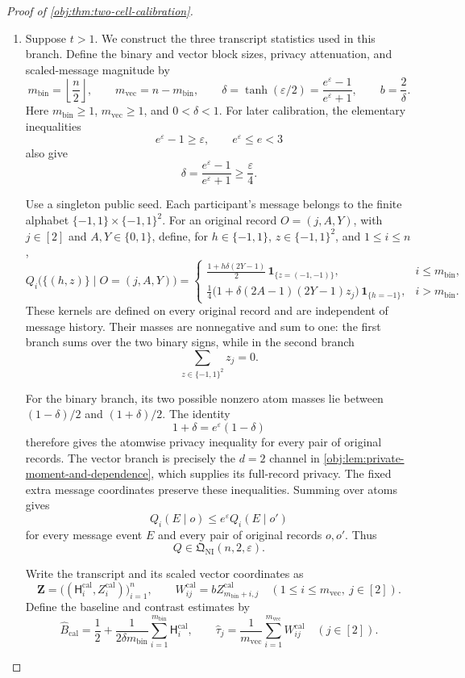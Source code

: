 \documentclass[11pt]{article}
\begin{document}
\begin{proof}[Proof of \cref{obj:thm:two-cell-calibration}]
\begin{enumerate}
\item
Suppose \(t>1\). We construct the three transcript statistics used in this branch. Define the binary and vector block sizes, privacy attenuation, and scaled-message magnitude by
\[
m_{\mathrm{bin}}=\left\lfloor\frac n2\right\rfloor,
\qquad
m_{\mathrm{vec}}=n-m_{\mathrm{bin}},
\qquad
\delta=\tanh(\varepsilon/2)
=\frac{e^\varepsilon-1}{e^\varepsilon+1},
\qquad
b=\frac2\delta.
\]
Here \(m_{\mathrm{bin}}\ge1\), \(m_{\mathrm{vec}}\ge1\), and \(0<\delta<1\).
For later calibration, the elementary inequalities
\[
e^\varepsilon-1\ge\varepsilon,
\qquad e^\varepsilon\le e<3
\]
also give
\[
\delta
=\frac{e^\varepsilon-1}{e^\varepsilon+1}
\ge\frac{\varepsilon}{4}.
\]

Use a singleton public seed. Each participant's message belongs to the finite alphabet
\(\{-1,1\}\times\{-1,1\}^{2}\). For an original record
\(O=(j,A,Y)\), with \(j\in[2]\) and \(A,Y\in\{0,1\}\), define, for
\(h\in\{-1,1\}\), \(z\in\{-1,1\}^{2}\), and \(1\le i\le n\),
\[
Q_i\bigl(\{(h,z)\}\mid O=(j,A,Y)\bigr)
=
\begin{cases}
\displaystyle
\frac{1+h\delta(2Y-1)}2\,
\mathbf1_{\{z=(-1,-1)\}},
& i\le m_{\mathrm{bin}},\\[6pt]
\displaystyle
\frac14\bigl(1+\delta(2A-1)(2Y-1)z_j\bigr)\,
\mathbf1_{\{h=-1\}},
& i>m_{\mathrm{bin}}.
\end{cases}
\]
These kernels are defined on every original record and are independent of message history. Their masses are nonnegative and sum to one: the first branch sums over the two binary signs, while in the second branch
\[
\sum_{z\in\{-1,1\}^{2}}z_j=0.
\]

For the binary branch, its two possible nonzero atom masses lie between
\((1-\delta)/2\) and \((1+\delta)/2\). The identity
\[
1+\delta=e^\varepsilon(1-\delta)
\]
therefore gives the atomwise privacy inequality for every pair of original records. The vector branch is precisely the \(d=2\) channel in
\cref{obj:lem:private-moment-and-dependence}, which supplies its full-record privacy. The fixed extra message coordinates preserve these inequalities. Summing over atoms gives
\[
Q_i(E\mid o)\le e^\varepsilon Q_i(E\mid o')
\]
for every message event \(E\) and every pair of original records \(o,o'\). Thus
\[
Q\in\mathfrak Q_{\mathrm{NI}}(n,2,\varepsilon).
\]

Write the transcript and its scaled vector coordinates as
\[
\mathbf Z
=\bigl((\mathsf H_i^{\mathrm{cal}},Z_i^{\mathrm{cal}})\bigr)_{i=1}^{n},
\qquad
W_{ij}^{\mathrm{cal}}
=bZ_{m_{\mathrm{bin}}+i,j}^{\mathrm{cal}}
\quad
(1\le i\le m_{\mathrm{vec}},\ j\in[2]).
\]
Define the baseline and contrast estimates by
\[
\widehat B_{\mathrm{cal}}
=\frac12+
\frac1{2\delta m_{\mathrm{bin}}}
\sum_{i=1}^{m_{\mathrm{bin}}}\mathsf H_i^{\mathrm{cal}},
\qquad
\widehat\tau_j
=\frac1{m_{\mathrm{vec}}}
\sum_{i=1}^{m_{\mathrm{vec}}}W_{ij}^{\mathrm{cal}}
\quad(j\in[2]).
\]


\end{enumerate}
\end{proof}
\end{document}
